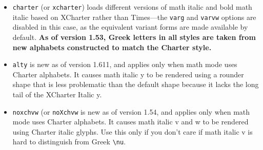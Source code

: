 \documentclass[\fsc]{article}
\theoremstyle{oldplain}
\theoremstyle{plain}
\begin{document}
\begin{itemize}
\item {\tt charter} (or {\tt xcharter}) loads different versions of math italic and bold math italic based on \textsf{XCharter} rather than \textsf{Times}---the {\tt varg} and {\tt varvw} options are disabled in this case, as the equivalent variant forms are made available by default. \textbf{As of version 1.53, Greek letters in all styles are taken from  new alphabets constructed to match the Charter style.}
\item {\tt alty}  is new as of version 1.611, and applies only when math mode uses Charter alphabets. It causes math italic y to be rendered using a rounder shape that is less problematic than the default shape because it lacks the long tail of the XCharter Italic {y}.
\item {\tt noxchvw} (or {\tt noXchvw} is new as of version 1.54, and applies only when math mode uses Charter alphabets. It causes math italic v and w to be rendered using Charter italic glyphs. Use this only if you don't care if math italic v is hard to distinguish from Greek \verb|\nu|.


\end{itemize}
\end{document}

